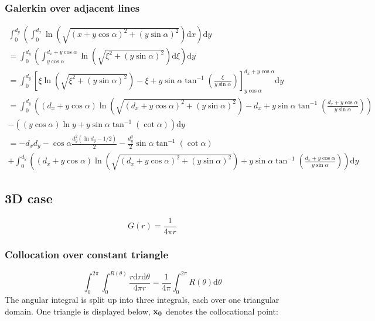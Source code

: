 \documentclass[a4paper,11pt]{article}
\newcommand{\td}{\mathrm{d}}
\begin{document}
\subsubsection{Galerkin over adjacent lines}

\begin{multline}
\int_{0}^{d_y}
\left(
\int_{0}^{d_x} \ln \left(\sqrt{(x+y\cos\alpha)^2+(y\sin\alpha)^2}\right)
\td x \right)
\td y \\
=
\int_{0}^{d_y}
\left(
\int_{y\cos\alpha}^{d_x+y\cos\alpha} \ln \left(\sqrt{\xi^2+(y\sin\alpha)^2}\right)
\td \xi \right)
\td y \\
=
\int_{0}^{d_y}
\left[
\xi \ln \left(\sqrt{\xi^2+(y\sin\alpha)^2}\right) - \xi + y\sin\alpha \tan^{-1} \left(\frac{\xi}{y\sin\alpha}\right)
\right]_{y\cos\alpha}^{d_x+y\cos\alpha} 
\td y \\
=
\int_{0}^{d_y}
\left(
\left(d_x+y\cos\alpha\right) \ln \left(\sqrt{\left(d_x+y\cos\alpha\right)^2+(y\sin\alpha)^2}\right) - d_x + y\sin\alpha \tan^{-1} \left(\frac{d_x+y\cos\alpha}{y\sin\alpha}\right)
\right) \\
-
\left(
\left(y\cos\alpha\right) \ln y + y\sin\alpha \tan^{-1} \left(\cot\alpha\right)
\right)
\td y \\
=
-d_x d_y - \cos\alpha \frac{d_y^2 \left(\ln d_y - 1/2\right)}{2}
-
\frac{d_y^2}{2}\sin\alpha \tan^{-1} \left(\cot\alpha\right) \\
+
\int_{0}^{d_y}
\left(
\left(d_x+y\cos\alpha\right) \ln \left(\sqrt{\left(d_x+y\cos\alpha\right)^2+(y\sin\alpha)^2}\right) + y\sin\alpha \tan^{-1} \left(\frac{d_x+y\cos\alpha}{y\sin\alpha}\right)
\right)
\td y
\end{multline}

\subsection{3D case}

\begin{equation}
G(r) = \frac{1}{4\pi r}
\end{equation}

\subsubsection{Collocation over constant triangle}

\begin{equation}
\int_0^{2\pi} \int_0^{R(\theta)} \frac{r \td r \td \theta}{4\pi r}
=
\frac{1}{4\pi}\int_0^{2\pi} R(\theta) \td \theta
\end{equation}
%
The angular integral is split up into three integrals, each over one triangular domain.
One triangle is displayed below, $\bf x_0$ denotes the collocational point:
\end{document}
